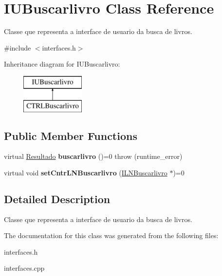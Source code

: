\hypertarget{classIUBuscarlivro}{}\section{I\+U\+Buscarlivro Class Reference}
\label{classIUBuscarlivro}


Classe que representa a interface de usuario da busca de livros.  




{\ttfamily \#include $<$interfaces.\+h$>$}

Inheritance diagram for I\+U\+Buscarlivro\+:\begin{figure}[H]
\begin{center}
\leavevmode
\includegraphics[height=2.000000cm]{classIUBuscarlivro}
\end{center}
\end{figure}
\subsection*{Public Member Functions}
\begin{DoxyCompactItemize}
\item 
\mbox{\label{classIUBuscarlivro_ae52dbdd65e898fcb0173895117cb62c7}} 
virtual \hyperlink{classResultado}{Resultado} {\bfseries buscarlivro} ()=0  throw (runtime\+\_\+error)
\item 
\mbox{\label{classIUBuscarlivro_abbb9b7eb41b4ec7352fecb9376ec0207}} 
virtual void {\bfseries set\+Cntr\+L\+N\+Buscarlivro} (\hyperlink{classILNBuscarlivro}{I\+L\+N\+Buscarlivro} $\ast$)=0
\end{DoxyCompactItemize}


\subsection{Detailed Description}
Classe que representa a interface de usuario da busca de livros. 

The documentation for this class was generated from the following files\+:\begin{DoxyCompactItemize}
\item 
interfaces.\+h\item 
interfaces.\+cpp\end{DoxyCompactItemize}
